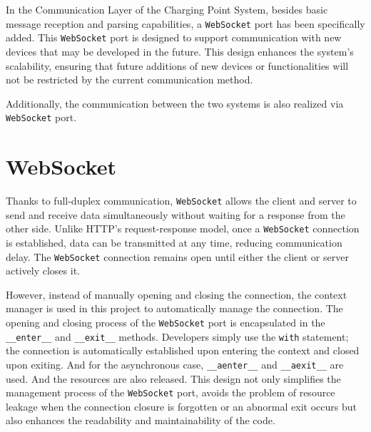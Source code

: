 \documentclass[
	english,
	ruledheaders=section,%
	class=report,%
	thesis={type=Report},%
	accentcolor=9c,%
	custommargins=true,%
	marginpar=false,%
	parskip=half-,%
	fontsize=11pt,%
	logofile={img/tuda_logo.pdf}, %
]{tudapub}
\begin{document}
In the Communication Layer of the Charging Point System, besides basic message reception and parsing capabilities, a \texttt{WebSocket} port has been specifically added. This \texttt{WebSocket} port is designed to support communication with new devices that may be developed in the future. This design enhances the system's scalability, ensuring that future additions of new devices or functionalities will not be restricted by the current communication method.

Additionally, the communication between the two systems is also realized via \texttt{WebSocket} port.

\section{WebSocket}
\label{sec: websocket}



Thanks to full-duplex communication, \texttt{WebSocket} allows the client and server to send and receive data simultaneously without waiting for a response from the other side. Unlike HTTP’s request-response model, once a \texttt{WebSocket} connection is established, data can be transmitted at any time, reducing communication delay\cite{websockets}. The \texttt{WebSocket} connection remains open until either the client or server actively closes it. 

However, instead of manually opening and closing the connection, the context manager is used in this project to automatically manage the connection. The opening and closing process of the \texttt{WebSocket} port is encapsulated in the \texttt{\_\_enter\_\_} and \texttt{\_\_exit\_\_} methods. Developers simply use the \texttt{with} statement; the connection is automatically established upon entering the context and closed upon exiting. And for the asynchronous case, \texttt{\_\_aenter\_\_} and \texttt{\_\_aexit\_\_} are used. And the resources are also released. This design not only simplifies the management process of the \texttt{WebSocket} port, avoids the problem of resource leakage when the connection closure is forgotten or an abnormal exit occurs but also enhances the readability and maintainability of the code.
\end{document}

